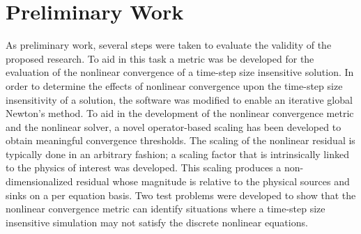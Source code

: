 \chapter{Preliminary Work}
\label{chap:prelim_work}
As preliminary work, several steps were taken to evaluate the validity of the proposed research.
To aid in this task a metric was be developed for the evaluation of the nonlinear convergence of a time-step size insensitive solution.
In order to determine the effects of nonlinear convergence upon the time-step size insensitivity of a solution, the \cobra{} software was modified to enable an iterative global Newton's method.
To aid in the development of the nonlinear convergence metric and the nonlinear solver, a novel operator-based scaling has been developed to obtain meaningful convergence thresholds.
The scaling of the nonlinear residual is typically done in an arbitrary fashion; a scaling factor that is intrinsically linked to the physics of interest was developed.
This scaling produces a non-dimensionalized residual whose magnitude is relative to the physical sources and sinks on a per equation basis. 
Two test problems were developed to show that the nonlinear convergence metric can identify situations where a time-step size insensitive simulation may not satisfy the discrete nonlinear equations.
